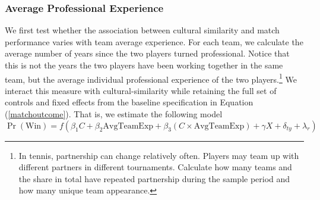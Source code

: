 \documentclass[10pt]{article}
\begin{document}
\subsubsection{Average Professional Experience} \label{sec:avgexp}










We first test whether the association between cultural similarity and match performance varies with team average experience. For each team, we calculate the average number of years since the two players turned professional. Notice that this is not the years the two players have been working together in the same team, but the average individual professional experience of the two players.\footnote{In tennis, partnership can change relatively often. Players may team up with different partners in different tournaments. Calculate how many teams and the share in total have repeated partnership during the sample period and how many unique team appearance.} We interact this measure with cultural-similarity while retaining the full set of controls and fixed effects from the baseline specification in Equation (\ref{matchoutcome}). That is, we estimate the following model
\begin{equation}
\operatorname{Pr}(\text{Win}) = f(\beta_1 C + \beta_2 \text{AvgTeamExp} + \beta_3 (C \times \text{AvgTeamExp}) + \gamma X + \delta_{ty} + \lambda_r)
\end{equation}
\end{document}
